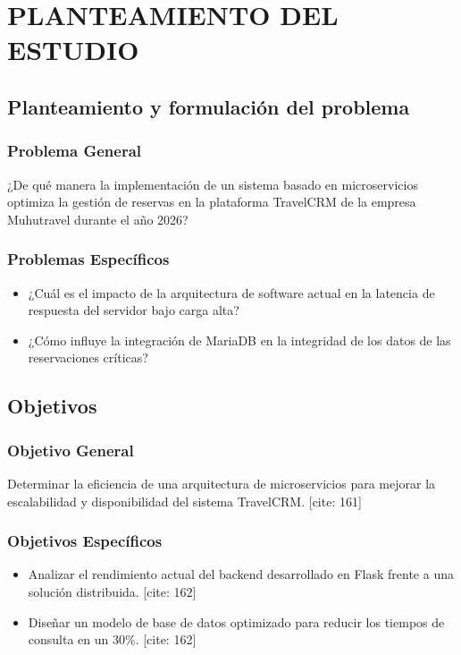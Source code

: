 \section{PLANTEAMIENTO DEL ESTUDIO}

\subsection{Planteamiento y formulación del problema}

\subsubsection{Problema General}
¿De qué manera la implementación de un sistema basado en microservicios optimiza la gestión de reservas en la plataforma TravelCRM de la empresa Muhutravel durante el año 2026?

\subsubsection{Problemas Específicos}
\begin{itemize}
    \item ¿Cuál es el impacto de la arquitectura de software actual en la latencia de respuesta del servidor bajo carga alta?
    \item ¿Cómo influye la integración de MariaDB en la integridad de los datos de las reservaciones críticas?
\end{itemize}

\subsection{Objetivos}

\subsubsection{Objetivo General}
Determinar la eficiencia de una arquitectura de microservicios para mejorar la escalabilidad y disponibilidad del sistema TravelCRM. [cite: 161]

\subsubsection{Objetivos Específicos}
\begin{itemize}
    \item Analizar el rendimiento actual del backend desarrollado en Flask frente a una solución distribuida. [cite: 162]
    \item Diseñar un modelo de base de datos optimizado para reducir los tiempos de consulta en un 30\%. [cite: 162]
\end{itemize}

